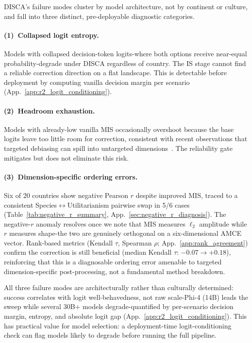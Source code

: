 \documentclass{article}
\begin{document}
DISCA's failure modes cluster by model architecture, not by continent or culture, and fall into three distinct, pre-deployable diagnostic categories.

\paragraph{(1)~Collapsed logit entropy.} Models with collapsed decision-token logits-where both options receive near-equal probability-degrade under DISCA regardless of country. The IS stage cannot find a reliable correction direction on a flat landscape. This is detectable before deployment by computing vanilla decision margin per scenario (App.~\ref{app:r2_logit_conditioning}).

\paragraph{(2)~Headroom exhaustion.} Models with already-low vanilla MIS occasionally overshoot because the base logits leave too little room for correction, consistent with recent observations that targeted debiasing can spill into untargeted dimensions~\citep{chand2026nofree}. The reliability gate mitigates but does not eliminate this risk.

\paragraph{(3)~Dimension-specific ordering errors.} Six of 20 countries show negative Pearson $r$ despite improved MIS, traced to a consistent Species$\leftrightarrow$Utilitarianism pairwise swap in 5/6 cases (Table~\ref{tab:negative_r_summary}, App.~\ref{sec:negative_r_diagnosis}). The negative-$r$ anomaly resolves once we note that MIS measures $\ell_2$ amplitude while $r$ measures shape-the two are genuinely orthogonal on a six-dimensional AMCE vector. Rank-based metrics (Kendall $\tau$, Spearman $\rho$; App.~\ref{app:rank_agreement}) confirm the correction is still beneficial (median Kendall $\tau$: $-0.07 \to +0.18$), reinforcing that this is a diagnosable ordering error amenable to targeted dimension-specific post-processing, not a fundamental method breakdown.

All three failure modes are architecturally rather than culturally determined: success correlates with logit well-behavedness, not raw scale-Phi-4 (14B) leads the sweep while several 30B+ models degrade-quantified by per-scenario decision margin, entropy, and absolute logit gap (App.~\ref{app:r2_logit_conditioning}). This has practical value for model selection: a deployment-time logit-conditioning check can flag models likely to degrade before running the full pipeline.
\fi
\end{document}
